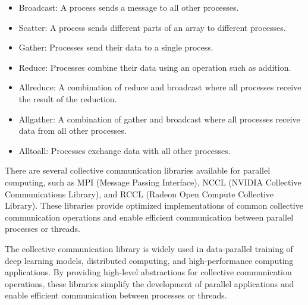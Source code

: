 \begin{itemize}
    \item Broadcast: A process sends a message to all other processes.
    \item Scatter: A process sends different parts of an array to
    different processes.
    \item Gather: Processes send their data to a single process.
    \item Reduce: Processes combine their data using an operation such as
    addition.
    \item Allreduce: A combination of reduce and broadcast where all
    processes receive the result of the reduction.
    \item Allgather: A combination of gather and broadcast where all
    processes receive data from all other processes.
    \item Alltoall: Processes exchange data with all other processes.
\end{itemize}


There are several collective communication libraries available for
parallel computing, such as MPI (Message Passing Interface), NCCL
(NVIDIA Collective Communications Library), and RCCL (Radeon Open
Compute Collective Library). These libraries provide optimized
implementations of common collective communication operations and
enable efficient communication between parallel processes or threads.

The collective communication library is widely used in data-parallel
training of deep learning models, distributed computing, and
high-performance computing applications. By providing high-level
abstractions for collective communication operations, these libraries
simplify the development of parallel applications and enable efficient
communication between processes or threads.